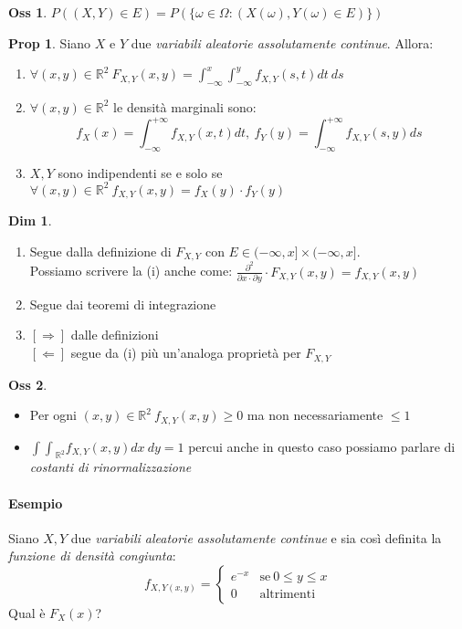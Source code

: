 \documentclass[12pt, a4paper]{report}
\theoremstyle{definition}
\newtheorem*{demonstration}{Dim}
\newtheorem*{proposition}{Prop}
\newtheorem*{observation}{Oss}
\DeclareRobustCommand{\R}{\mathbb{R}}%
\begin{document}
\begin{observation}
	\(P((X,Y)\in E)=P(\{\omega\in\Omega:(X(\omega),Y(\omega)\in E)\})\)
\end{observation}
\begin{proposition}
	Siano $X$ e $Y$ due \emph{variabili aleatorie assolutamente continue}. Allora:
	\begin{enumerate}[label=(\roman*)]
		\item \(\forall(x,y)\in\R^2\ F_{X,Y}(x,y)=\int_{-\infty}^{x}
		\int_{-\infty}^{y}f_{X,Y}(s,t)dt\ ds\)
		\item \(\forall(x,y)\in\R^2\) le densità marginali sono:
		\[f_X(x)=\int_{-\infty}^{+\infty}f_{X,Y}(x,t)dt,\ f_Y(y)=\int_{-\infty}^
		{+\infty}f_{X,Y}(s,y)ds\]
		\item $X,Y$ sono indipendenti se e solo se \(\forall(x,y)\in\R^2\ f_{X,Y}
		(x,y)=f_X(y)\cdot f_Y(y)\)
	\end{enumerate}
\end{proposition}
\newpage
\begin{demonstration}
	\mbox{}
	\begin{enumerate}[label=(\roman*)]
		\item Segue dalla definizione di $F_{X,Y}$ con \(E\in(-\infty,x]\times
		(-\infty,x]\).\\
		Possiamo scrivere la (i) anche come: \(\frac{\partial^2}{\partial x\cdot 
		\partial y}\cdot F_{X,Y}(x,y)=f_{X,Y}(x,y)\)
		\item Segue dai teoremi di integrazione
		\item $[\Rightarrow]$ dalle definizioni\\
		$[\Leftarrow]$ segue da (i) più un'analoga proprietà per $F_{X,Y}$
	\end{enumerate}
\end{demonstration}

\begin{observation}
	\mbox{}
	\begin{itemize}
		\item Per ogni \((x,y)\in\R^2\ f_{X,Y}(x,y)\geq 0\) ma non necessariamente
		$\leq 1$
		\item \({\int\int}_{\R^2}f_{X,Y}(x,y)dx\ dy=1\) percui anche in questo
		caso possiamo parlare di \emph{costanti di rinormalizzazione}
	\end{itemize}
\end{observation}

\paragraph*{Esempio}
Siano $X,Y$ due \emph{variabili aleatorie assolutamente continue} e sia così
definita la \emph{funzione di densità congiunta}:
\[f_{X,Y(x,y)}=\begin{cases}
	{e^{-x}} & \text{se}\ {0\leq y\leq x}\\
	{0} & \text{altrimenti}
\end{cases}\]
Qual è $F_X(x)$?
\end{document}
